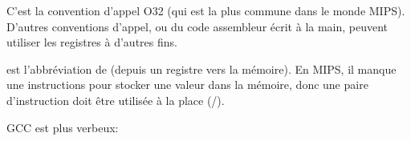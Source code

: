 C'est la convention d'appel O32 (qui est la plus commune dans le monde MIPS).
D'autres conventions d'appel, ou du code assembleur écrit à la main, peuvent
utiliser les registres à d'autres fins.


 est l'abbréviation de  (depuis un registre vers la mémoire).
En MIPS, il manque une instructions pour stocker une valeur dans la mémoire, donc
une paire d'instruction doit être utilisée à la place (/).






GCC \NonOptimizing est plus verbeux:





